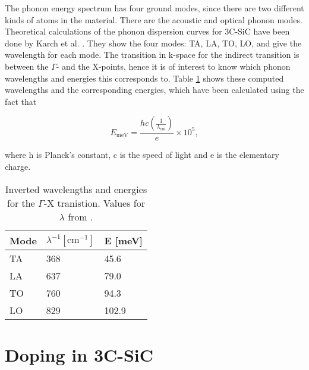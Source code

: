 The phonon energy spectrum has four ground modes, since there are two different kinds of atoms in the material. There are the acoustic and optical phonon modes. Theoretical calculations of the phonon dispersion curves for 3C-SiC have been done by Karch et al. \cite{Karch1994}. They show the four modes: TA, LA, TO, LO, and give the wavelength for each mode. The transition in k-space for the indirect transition is between the $\Gamma$- and the X-points, hence it is of interest to know which phonon wavelengths and energies this corresponds to.  Table \ref{tab:phonons} shows these computed wavelengths and the corresponding energies, which have been calculated using the fact that

\[E_\mathrm{meV} = \frac{hc(\frac{1}{\lambda_{cm}})}{e}\times 10^5,\]

\noindent where h is Planck's constant, c is the speed of light and e is the elementary charge. 

\begin{table}[h]
\caption{Inverted wavelengths and energies for the $\Gamma$-X tranistion. Values for $\lambda$ from \cite{Karch1994}.}
\label{tab:phonons}
\begin{center}
\begin{tabular}{ l l l }
  \hline                       
  \hline       
  \vspace{1mm}
    Mode  & $\lambda^{-1} [\mathrm{cm}^{-1}]$  & E [meV]\\
    \hline
  TA &  368 & 45.6\\
  LA &  637 & 79.0\\
  TO &  760 & 94.3\\
  LO &  829 & 102.9\\
  \hline  
\end{tabular}
\end{center}
\end{table}









\section{Doping in 3C-SiC}
\label{sec:doping_in_3C}

	
